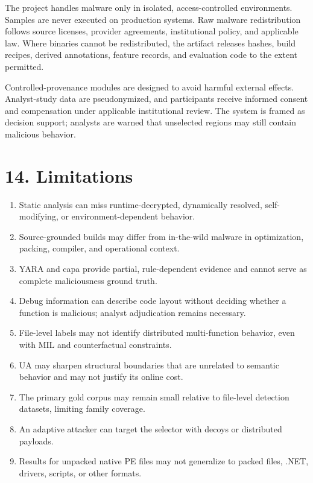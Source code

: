 \documentclass[
  10pt,
]{article}
\providecommand{\tightlist}{%
  \setlength{\itemsep}{0pt}\setlength{\parskip}{0pt}}
\begin{document}
The project handles malware only in isolated, access-controlled
environments. Samples are never executed on production systems. Raw
malware redistribution follows source licenses, provider agreements,
institutional policy, and applicable law. Where binaries cannot be
redistributed, the artifact releases hashes, build recipes, derived
annotations, feature records, and evaluation code to the extent
permitted.

Controlled-provenance modules are designed to avoid harmful external
effects. Analyst-study data are pseudonymized, and participants receive
informed consent and compensation under applicable institutional review.
The system is framed as decision support; analysts are warned that
unselected regions may still contain malicious behavior.

\section{14. Limitations}\label{limitations}

\begin{enumerate}
\def\labelenumi{\arabic{enumi}.}
\tightlist
\item
  Static analysis can miss runtime-decrypted, dynamically resolved,
  self-modifying, or environment-dependent behavior.
\item
  Source-grounded builds may differ from in-the-wild malware in
  optimization, packing, compiler, and operational context.
\item
  YARA and capa provide partial, rule-dependent evidence and cannot
  serve as complete maliciousness ground truth.
\item
  Debug information can describe code layout without deciding whether a
  function is malicious; analyst adjudication remains necessary.
\item
  File-level labels may not identify distributed multi-function
  behavior, even with MIL and counterfactual constraints.
\item
  UA may sharpen structural boundaries that are unrelated to semantic
  behavior and may not justify its online cost.
\item
  The primary gold corpus may remain small relative to file-level
  detection datasets, limiting family coverage.
\item
  An adaptive attacker can target the selector with decoys or
  distributed payloads.
\item
  Results for unpacked native PE files may not generalize to packed
  files, .NET, drivers, scripts, or other formats.
\end{enumerate}
\end{document}
